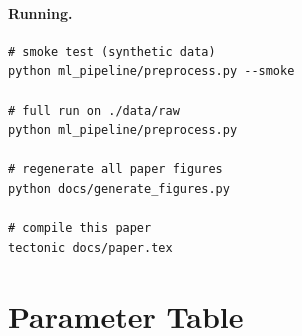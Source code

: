 \documentclass[conference,10pt]{IEEEtran}
\begin{document}
\paragraph{Running.}
\begin{lstlisting}
# smoke test (synthetic data)
python ml_pipeline/preprocess.py --smoke

# full run on ./data/raw
python ml_pipeline/preprocess.py

# regenerate all paper figures
python docs/generate_figures.py

# compile this paper
tectonic docs/paper.tex
\end{lstlisting}

\section{Parameter Table}
\label{app:params}
\end{document}
